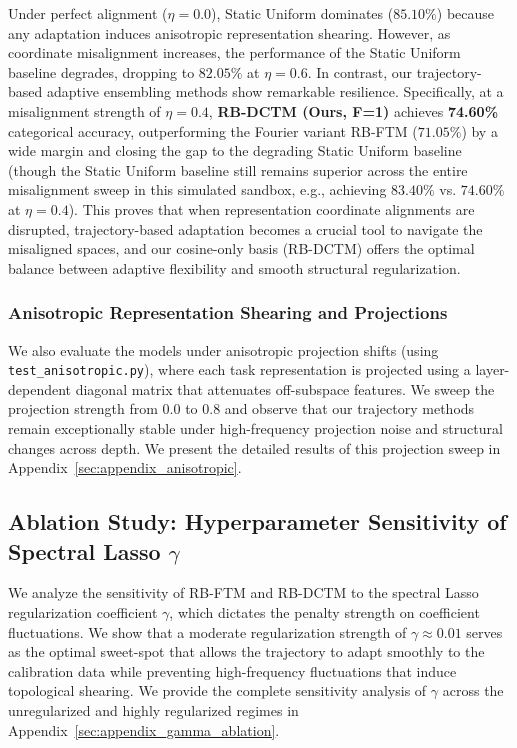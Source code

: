 Under perfect alignment ($\eta = 0.0$), Static Uniform dominates ($85.10\%$) because any adaptation induces anisotropic representation shearing. However, as coordinate misalignment increases, the performance of the Static Uniform baseline degrades, dropping to $82.05\%$ at $\eta = 0.6$. In contrast, our trajectory-based adaptive ensembling methods show remarkable resilience. Specifically, at a misalignment strength of $\eta = 0.4$, \textbf{RB-DCTM (Ours, F=1)} achieves \textbf{74.60\%} categorical accuracy, outperforming the Fourier variant RB-FTM ($71.05\%$) by a wide margin and closing the gap to the degrading Static Uniform baseline (though the Static Uniform baseline still remains superior across the entire misalignment sweep in this simulated sandbox, e.g., achieving $83.40\%$ vs. $74.60\%$ at $\eta = 0.4$). This proves that when representation coordinate alignments are disrupted, trajectory-based adaptation becomes a crucial tool to navigate the misaligned spaces, and our cosine-only basis (RB-DCTM) offers the optimal balance between adaptive flexibility and smooth structural regularization.

\subsubsection{Anisotropic Representation Shearing and Projections}
We also evaluate the models under anisotropic projection shifts (using \texttt{test\_anisotropic.py}), where each task representation is projected using a layer-dependent diagonal matrix that attenuates off-subspace features. We sweep the projection strength from $0.0$ to $0.8$ and observe that our trajectory methods remain exceptionally stable under high-frequency projection noise and structural changes across depth. We present the detailed results of this projection sweep in Appendix~\ref{sec:appendix_anisotropic}.

\subsection{Ablation Study: Hyperparameter Sensitivity of Spectral Lasso $\gamma$}
We analyze the sensitivity of RB-FTM and RB-DCTM to the spectral Lasso regularization coefficient $\gamma$, which dictates the penalty strength on coefficient fluctuations. We show that a moderate regularization strength of $\gamma \approx 0.01$ serves as the optimal sweet-spot that allows the trajectory to adapt smoothly to the calibration data while preventing high-frequency fluctuations that induce topological shearing. We provide the complete sensitivity analysis of $\gamma$ across the unregularized and highly regularized regimes in Appendix~\ref{sec:appendix_gamma_ablation}.

